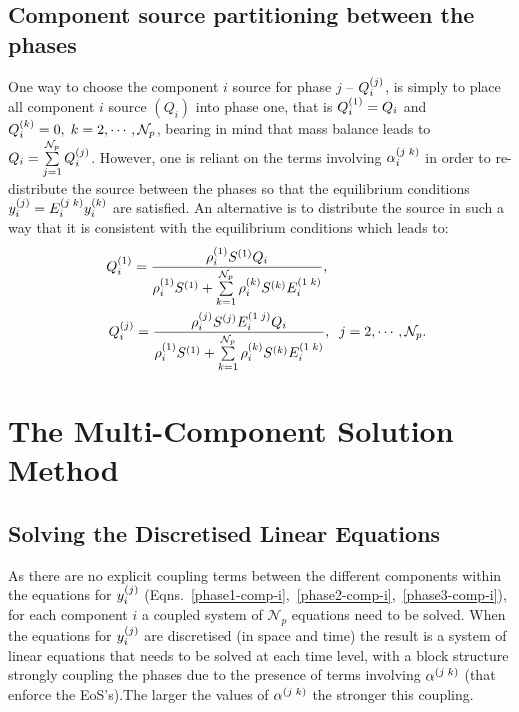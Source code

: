 \subsection{Component source partitioning between the phases}\label{ComponentPhaseSourcePartitioning} 
One way to choose the component $i$ source for phase $j$ -- $\mfr[Q]{i}{j}$, is simply to place all component $i$ source $\left(Q_{i}\right)$ into phase one, that is $\mfr[Q]{i}{1}=Q_{i}$ and  $\mfr[Q]{i}{k}=0, \; k=2,\cdots,\mathcal{N}_{p}$, bearing in mind that mass balance leads to  $Q_{i}=\summation_{j=1}^{\mathcal{N}_{p}} \mfr[Q]{i}{j}$. However, one is reliant on the terms involving $\mfr[\alpha]{i}{j\;k}$ in order to re-distribute the source between the phases so that the equilibrium conditions $\mfr[y]{i}{j} = \mfr[E]{i}{j\;k} \mfr[y]{i}{k}$ are satisfied. An alternative is to distribute the source in such a way that it is consistent with the equilibrium conditions which leads to:
     \begin{subequations}
        \begin{align}
           && \mfr[Q]{i}{1} = \frc{\mfr[\rho]{i}{1} \mfr[S]{}{1} Q_{i}} {\mfr[\rho]{i}{1}\mfr[S]{}{1} + \summation_{k=1}^{\mathcal{N}_{p}}\mfr[\rho]{i}{k}\mfr[S]{}{k}\mfr[E]{i}{1\;k}},\hspace{2.5cm} \label{Qi1} \\
%
           && \mfr[Q]{i}{j} = \frc{\mfr[\rho]{i}{j} \mfr[S]{}{j} \mfr[E]{i}{1\;j} Q_{i}} {\mfr[\rho]{i}{1} \mfr[S]{}{1} + \summation_{k=1}^{\mathcal{N}_{p}} \mfr[\rho]{i}{k} \mfr[S]{}{k} \mfr[E]{i}{1\;k} }, \;\; j = 2,\cdots, \mathcal{N}_{p}.\label{Qi2}
        \end{align}
     \end{subequations}


\section{The Multi-Component Solution Method}\label{Chapter:CompositionalModel:Section:SolutionMethod}

\subsection{Solving the Discretised Linear Equations} \label{Chapter:CompositionalModel:Section:Structure_Yij}
As there are no explicit coupling terms between the different components within the equations for $\mfr[y]{i}{j}$ (\eg Eqns.~\ref{phase1-comp-i},~\ref{phase2-comp-i},~\ref{phase3-comp-i}), for each component $i$ a coupled system of $\mathcal{N}_{p}$ equations need to be solved. When the equations for $\mfr[y]{i}{j}$ are discretised (in space and time) the result is a system of linear equations that needs to be solved at each time level, with a block structure strongly coupling the phases due to the presence of terms involving $\mfr[\alpha]{}{j\;k}$ (that enforce the EoS's).The larger the values of $\mfr[\alpha]{}{j\;k}$ the stronger this coupling. 

